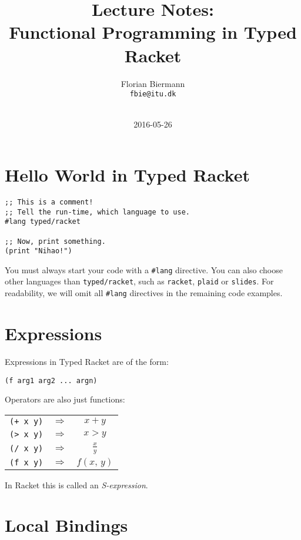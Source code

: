 \documentclass{article}
\title{Lecture Notes:\\Functional Programming in Typed Racket}
\author{Florian Biermann \\\small{\texttt{fbie@itu.dk}} \\~}
\date{2016-05-26}
\begin{document}
\maketitle

\section{Hello World in Typed Racket}

\begin{lstlisting}
;; This is a comment!
;; Tell the run-time, which language to use.
#lang typed/racket

;; Now, print something.
(print "Nihao!")
\end{lstlisting}

You must always start your code with a \lstinline{#lang} directive. You can also choose other languages than \lstinline{typed/racket}, such as \lstinline{racket}, \lstinline{plaid} or \lstinline{slides}. For readability, we will omit all \lstinline{#lang} directives in the remaining code examples.

\section{Expressions}

Expressions in Typed Racket are of the form:

\begin{center}
  \lstinline{(f arg1 arg2 ... argn)}
\end{center}

Operators are also just functions:

\begin{center}
  \begin{tabular}{ccc}
    \lstinline{(+ x y)} & $\Rightarrow$ & $x + y$ \\
    \lstinline{(> x y)} & $\Rightarrow$ & $x > y$ \\
    \lstinline{(/ x y)} & $\Rightarrow$ & $\frac{x}{y}$ \\
    \lstinline{(f x y)} & $\Rightarrow$ & $f(x, \, y)$
  \end{tabular}
\end{center}

In Racket this is called an \emph{S-expression}.

\section{Local Bindings}
\end{document}
